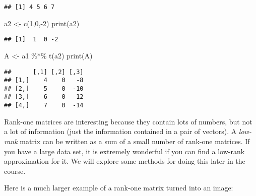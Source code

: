 \documentclass[
]{article}
\newenvironment{Shaded}{\begin{snugshade}}{\end{snugshade}}
\newcommand{\DecValTok}[1]{\textcolor[rgb]{0.00,0.00,0.81}{#1}}
\newcommand{\FunctionTok}[1]{\textcolor[rgb]{0.00,0.00,0.00}{#1}}
\newcommand{\NormalTok}[1]{#1}
\newcommand{\OtherTok}[1]{\textcolor[rgb]{0.56,0.35,0.01}{#1}}
\newcommand{\SpecialCharTok}[1]{\textcolor[rgb]{0.00,0.00,0.00}{#1}}
\begin{document}
\begin{verbatim}
## [1] 4 5 6 7
\end{verbatim}

\begin{Shaded}
\begin{Highlighting}[]
\NormalTok{a2 }\OtherTok{\textless{}{-}} \FunctionTok{c}\NormalTok{(}\DecValTok{1}\NormalTok{,}\DecValTok{0}\NormalTok{,}\SpecialCharTok{{-}}\DecValTok{2}\NormalTok{)}
\FunctionTok{print}\NormalTok{(a2)}
\end{Highlighting}
\end{Shaded}

\begin{verbatim}
## [1]  1  0 -2
\end{verbatim}

\begin{Shaded}
\begin{Highlighting}[]
\NormalTok{A }\OtherTok{\textless{}{-}}\NormalTok{ a1 }\SpecialCharTok{\%*\%} \FunctionTok{t}\NormalTok{(a2)}
\FunctionTok{print}\NormalTok{(A)}
\end{Highlighting}
\end{Shaded}

\begin{verbatim}
##      [,1] [,2] [,3]
## [1,]    4    0   -8
## [2,]    5    0  -10
## [3,]    6    0  -12
## [4,]    7    0  -14
\end{verbatim}

Rank-one matrices are interesting because they contain lots of numbers,
but not a lot of information (just the information contained in a pair
of vectors). A \emph{low-rank} matrix can be written as a sum of a small
number of rank-one matrices. If you have a large data set, it is
extremely wonderful if you can find a low-rank approximation for it. We
will explore some methods for doing this later in the course.

Here is a much larger example of a rank-one matrix turned into an image:
\end{document}
